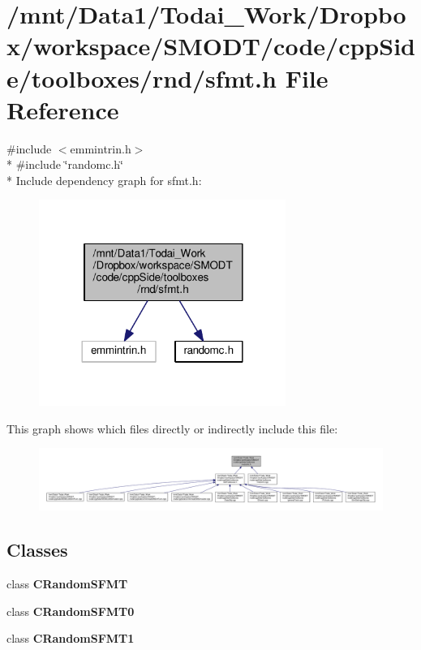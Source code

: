 \section{/mnt/\-Data1/\-Todai\-\_\-\-Work/\-Dropbox/workspace/\-S\-M\-O\-D\-T/code/cpp\-Side/toolboxes/rnd/sfmt.h File Reference}
\label{toolboxes_2rnd_2sfmt_8h}
{\ttfamily \#include $<$emmintrin.\-h$>$}\\*
{\ttfamily \#include \char`\"{}randomc.\-h\char`\"{}}\\*
Include dependency graph for sfmt.\-h\-:\nopagebreak
\begin{figure}[H]
\begin{center}
\leavevmode
\includegraphics[width=228pt]{toolboxes_2rnd_2sfmt_8h__incl}
\end{center}
\end{figure}
This graph shows which files directly or indirectly include this file\-:\nopagebreak
\begin{figure}[H]
\begin{center}
\leavevmode
\includegraphics[width=350pt]{toolboxes_2rnd_2sfmt_8h__dep__incl}
\end{center}
\end{figure}
\subsection*{Classes}
\begin{DoxyCompactItemize}
\item 
class {\bf C\-Random\-S\-F\-M\-T}
\item 
class {\bf C\-Random\-S\-F\-M\-T0}
\item 
class {\bf C\-Random\-S\-F\-M\-T1}
\end{DoxyCompactItemize}
